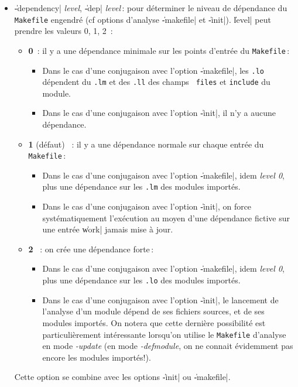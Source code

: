 \begin{itemize}
\item {\Large \|-dependency| {\em level}, \|-dep| {\em level}}\,: pour
d\'{e}terminer le niveau de 
d\'{e}pendance du {\tt Makefile} engendr\'{e} (cf options d'analyse
\|-makefile| et \|-init|). \|level| peut prendre les valeurs 0, 1, 2\ :
\begin{itemize}
\item {\Large {\bf 0}}\, :
il y a une d\'{e}pendance minimale sur les points d'entr\'{e}e du
{\tt Makefile}\,:\\
\begin{itemize}
\item
Dans le cas d'une conjugaison avec l'option \|-makefile|, 
les {\tt .lo} d\'{e}pendent du {\tt .lm} et des {\tt .ll} des champs {\tt
files} et {\tt include} du module.
\item
Dans le cas d'une conjugaison avec l'option \|-init|, il n'y a aucune
d\'{e}pendance. 
\end{itemize}
\item {\Large {\bf 1}} (d\'{e}faut) \ :
il y a une d\'{e}pendance normale sur chaque entr\'{e}e du {\tt Makefile}\,: \\
\begin{itemize}
\item
Dans le cas d'une conjugaison avec l'option \|-makefile|, 
idem {\em level 0}, plus une d\'{e}pendance sur
les {\tt .lm} des modules import\'{e}s. 
\item
Dans le cas d'une conjugaison avec l'option \|-init|, on force
syst\'{e}matiquement l'ex\'{e}cution au moyen d'une d\'{e}pendance fictive sur
une entr\'{e}e \|work| jamais mise \`{a} jour.
\end{itemize}
\item {\Large {\bf 2}} \ :
on cr\'{e}e une d\'{e}pendance forte\,: \\
\begin{itemize}
\item
Dans le cas d'une conjugaison avec l'option \|-makefile|, 
idem {\em level 0}, plus une d\'{e}pendance sur
les {\tt .lo} des modules import\'{e}s.
\item
Dans le cas d'une conjugaison avec l'option \|-init|, le lancement de
l'analyse d'un module d\'{e}pend de ses fichiers sources, et de ses
modules import\'{e}s. On notera que cette derni\`{e}re possibilit\'{e} est
particuli\`{e}rement int\'{e}ressante lorsqu'on utilise le {\tt Makefile} d'analyse
en mode {\it -update} (en mode {\it -defmodule}, on ne connait
\'{e}videmment pas encore les modules import\'{e}s!).
\end{itemize}
\end{itemize}
Cette option se combine avec les options \|-init| ou \|-makefile|.


\end{itemize}

